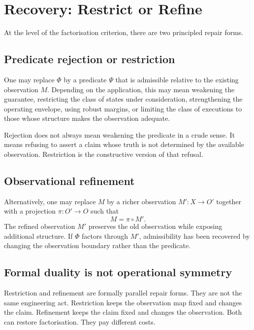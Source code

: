 \documentclass[a4paper,11pt]{article}
\begin{document}
\section{Recovery: Restrict or Refine}
\label{sec:recovery}

At the level of the factorisation criterion, there are two principled repair
forms.

\subsection{Predicate rejection or restriction}

One may replace \(\Phi\) by a predicate \(\Psi\) that is admissible relative to
the existing observation \(M\). Depending on the application, this may mean
weakening the guarantee, restricting the class of states under consideration,
strengthening the operating envelope, using robust margins, or limiting the
class of executions to those whose structure makes the observation adequate.

Rejection does not always mean weakening the predicate in a crude sense. It
means refusing to assert a claim whose truth is not determined by the available
observation. Restriction is the constructive version of that refusal.

\subsection{Observational refinement}

Alternatively, one may replace \(M\) by a richer observation \(M' : X \to O'\)
together with a projection \(\pi : O' \to O\) such that
\[
  M = \pi \circ M'.
\]
The refined observation \(M'\) preserves the old observation while exposing
additional structure. If \(\Phi\) factors through \(M'\), admissibility has been
recovered by changing the observation boundary rather than the predicate.

\subsection{Formal duality is not operational symmetry}
\label{subsec:not-symmetric}

Restriction and refinement are formally parallel repair forms. They are not the
same engineering act. Restriction keeps the observation map fixed and changes
the claim. Refinement keeps the claim fixed and changes the observation. Both
can restore factorisation. They pay different costs.
\end{document}
